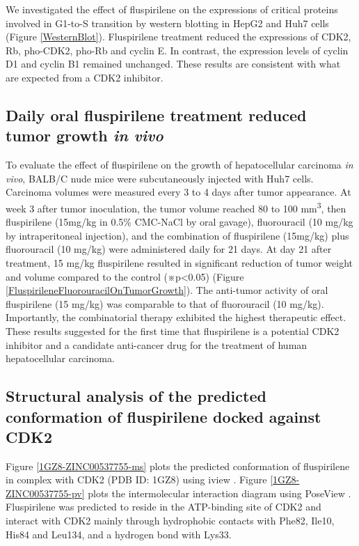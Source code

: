 \documentclass[10pt]{article}
\begin{document}
We investigated the effect of fluspirilene on the expressions of critical proteins involved in G1-to-S transition by western blotting in HepG2 and Huh7 cells (Figure \ref{WesternBlot}). Fluspirilene treatment reduced the expressions of CDK2, Rb, pho-CDK2, pho-Rb and cyclin E. In contrast, the expression levels of cyclin D1 and cyclin B1 remained unchanged. These results are consistent with what are expected from a CDK2 inhibitor.

\subsection*{Daily oral fluspirilene treatment reduced tumor growth \textit{in vivo}}

To evaluate the effect of fluspirilene on the growth of hepatocellular carcinoma \textit{in vivo}, BALB/C nude mice were subcutaneously injected with Huh7 cells. Carcinoma volumes were measured every 3 to 4 days after tumor appearance. At week 3 after tumor inoculation, the tumor volume reached 80 to 100 mm\textsuperscript{3}, then fluspirilene (15mg/kg in 0.5\% CMC-NaCl by oral gavage), fluorouracil (10 mg/kg by intraperitoneal injection), and the combination of fluspirilene (15mg/kg) plus fluorouracil (10 mg/kg) were administered daily for 21 days. At day 21 after treatment, 15 mg/kg fluspirilene resulted in significant reduction of tumor weight and volume compared to the control (※p<0.05) (Figure \ref{FluspirileneFluorouracilOnTumorGrowth}). The anti-tumor activity of oral fluspirilene (15 mg/kg) was comparable to that of fluorouracil (10 mg/kg). Importantly, the combinatorial therapy exhibited the highest therapeutic effect. These results suggested for the first time that fluspirilene is a potential CDK2 inhibitor and a candidate anti-cancer drug for the treatment of human hepatocellular carcinoma.

\subsection*{Structural analysis of the predicted conformation of fluspirilene docked against CDK2}

Figure \ref{1GZ8-ZINC00537755-ms} plots the predicted conformation of fluspirilene in complex with CDK2 (PDB ID: 1GZ8) using iview \cite{1366}. Figure \ref{1GZ8-ZINC00537755-pv} plots the intermolecular interaction diagram using PoseView \cite{748}. Fluspirilene was predicted to reside in the ATP-binding site of CDK2 and interact with CDK2 mainly through hydrophobic contacts with Phe82, Ile10, His84 and Leu134, and a hydrogen bond with Lys33.
\end{document}
